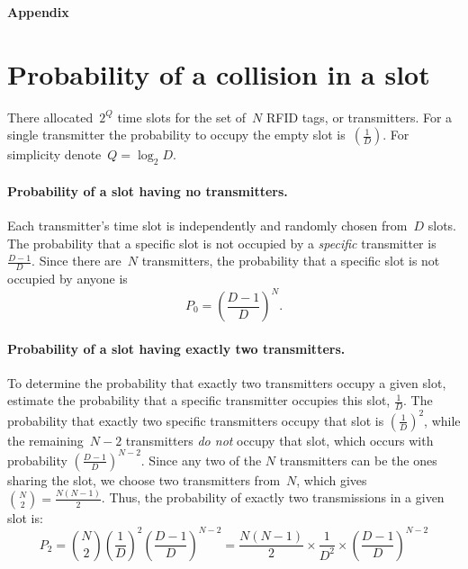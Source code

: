 \documentclass[12pt]{article}
\begin{document}
\clearpage 

\begin{center}
{\Huge\bf Appendix}
\end{center}
\section{Probability of a collision in a slot}
There allocated~$2^Q$ time slots for the set of~$N$ RFID tags, or transmitters. For a single transmitter the probability to occupy the empty slot is~$\left( \frac{1}{D} \right)$. For simplicity denote~$Q = \log_2 D$.


\paragraph{Probability of a slot having no transmitters.}  Each transmitter's time slot is independently and randomly chosen from~$D$ slots. The probability that a specific slot is not occupied by a \emph{specific} transmitter is $\frac{D-1}{D}$. Since there are~$N$ transmitters, the probability that a specific slot is not occupied by anyone is
\[
P_0 = \left( \frac{D-1}{D} \right)^N.
\]
\paragraph{Probability of a slot having exactly two transmitters.}
To determine the probability that exactly two transmitters occupy a given slot, estimate the probability that a specific transmitter occupies this slot, $\frac{1}{D}$. The probability that exactly two specific transmitters occupy that slot is 
$\left(\frac{1}{D}\right)^2$, while the remaining~$N-2$ transmitters \emph{do not} occupy that slot, which occurs with probability $ \left(\frac{D-1}{D}\right)^{N-2} $.  Since any two of the \( N \) transmitters can be the ones sharing the slot, we choose two transmitters from~$N$, which gives %
$\binom{N}{2} = \frac{N(N-1)}{2}$.
Thus, the probability of exactly two transmissions in a given slot is:
\[
P_2 = \binom{N}{2} \left(\frac{1}{D}\right)^2 \left(\frac{D-1}{D}\right)^{N-2}
= \frac{N(N-1)}{2}  \times \frac{1}{D^2} \times \left(\frac{D-1}{D}\right)^{N-2}
\]
\end{document}
